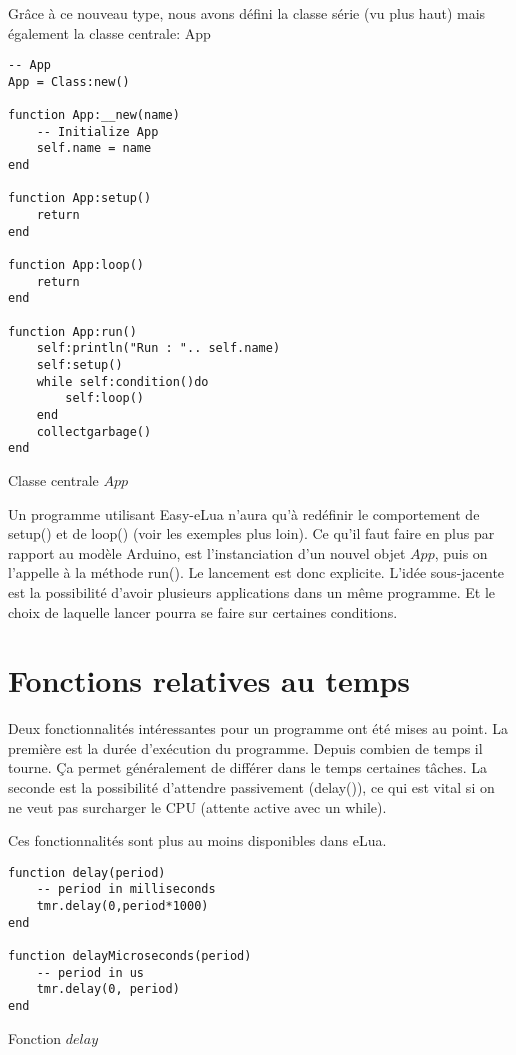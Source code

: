 \newpage

Grâce à ce nouveau type, nous avons défini la classe série (vu plus haut) mais également la classe centrale: App

\begin{table}[h]
\begin{lstlisting}
-- App
App = Class:new()

function App:__new(name)
    -- Initialize App
    self.name = name
end

function App:setup()
    return
end

function App:loop()
    return
end

function App:run()
    self:println("Run : ".. self.name)
    self:setup()
    while self:condition()do
        self:loop()
    end
    collectgarbage()
end
\end{lstlisting}
\caption{Classe centrale $App$}
\end{table}

Un programme utilisant Easy-eLua n’aura qu'à redéfinir le comportement de setup() et de loop() (voir les exemples plus loin). 
Ce qu'il faut faire en plus par rapport au modèle Arduino, est l’instanciation d’un nouvel objet $App$, puis on l'appelle à la méthode run(). 
Le lancement est donc explicite. L’idée sous-jacente est la possibilité d’avoir plusieurs applications dans un même programme.
Et le choix de laquelle lancer pourra se faire sur certaines conditions. 

\section{Fonctions relatives au temps}

Deux fonctionnalités intéressantes pour un programme ont été mises au point. 
La première est la durée d’exécution du programme. Depuis combien de temps il tourne. Ça permet généralement de différer dans le temps 
certaines tâches. La seconde est la possibilité d'attendre passivement (delay()), ce qui est vital si on ne veut pas surcharger le CPU 
(attente active avec un while).

Ces fonctionnalités sont plus au moins disponibles dans eLua.
\newpage
\begin{table}[h]
\begin{lstlisting}
function delay(period)
    -- period in milliseconds
    tmr.delay(0,period*1000)
end

function delayMicroseconds(period)
    -- period in us
    tmr.delay(0, period)
end
\end{lstlisting}
\caption{Fonction $delay$}
\end{table}

